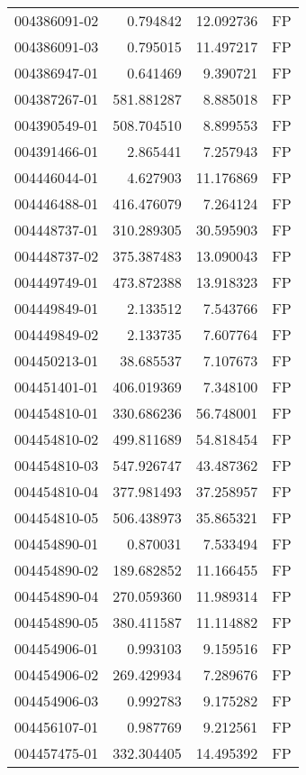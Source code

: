 \begin{tabular}{lrrl}
004386091-02 &    0.794842 &    12.092736 &   FP \\
004386091-03 &    0.795015 &    11.497217 &   FP \\
004386947-01 &    0.641469 &     9.390721 &   FP \\
004387267-01 &  581.881287 &     8.885018 &   FP \\
004390549-01 &  508.704510 &     8.899553 &   FP \\
004391466-01 &    2.865441 &     7.257943 &   FP \\
004446044-01 &    4.627903 &    11.176869 &   FP \\
004446488-01 &  416.476079 &     7.264124 &   FP \\
004448737-01 &  310.289305 &    30.595903 &   FP \\
004448737-02 &  375.387483 &    13.090043 &   FP \\
004449749-01 &  473.872388 &    13.918323 &   FP \\
004449849-01 &    2.133512 &     7.543766 &   FP \\
004449849-02 &    2.133735 &     7.607764 &   FP \\
004450213-01 &   38.685537 &     7.107673 &   FP \\
004451401-01 &  406.019369 &     7.348100 &   FP \\
004454810-01 &  330.686236 &    56.748001 &   FP \\
004454810-02 &  499.811689 &    54.818454 &   FP \\
004454810-03 &  547.926747 &    43.487362 &   FP \\
004454810-04 &  377.981493 &    37.258957 &   FP \\
004454810-05 &  506.438973 &    35.865321 &   FP \\
004454890-01 &    0.870031 &     7.533494 &   FP \\
004454890-02 &  189.682852 &    11.166455 &   FP \\
004454890-04 &  270.059360 &    11.989314 &   FP \\
004454890-05 &  380.411587 &    11.114882 &   FP \\
004454906-01 &    0.993103 &     9.159516 &   FP \\
004454906-02 &  269.429934 &     7.289676 &   FP \\
004454906-03 &    0.992783 &     9.175282 &   FP \\
004456107-01 &    0.987769 &     9.212561 &   FP \\
004457475-01 &  332.304405 &    14.495392 &   FP \\

\end{tabular}
